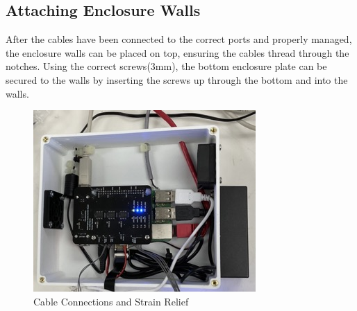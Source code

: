 \subsection{Attaching Enclosure Walls}
After the cables have been connected to the correct ports and properly managed, the enclosure walls can be placed on top, ensuring the cables thread through the notches. Using the correct screws(3mm), the bottom enclosure plate can be secured to the walls by inserting the screws up through the bottom and into the walls.
\begin{figure}[H]
        \centering
        \includegraphics[width=.5\textwidth]{graphics/Internals Cables.jpeg}
        \caption{Cable Connections and Strain Relief}
        \label{fig:Cables}
    \end{figure}
\pagebreak

